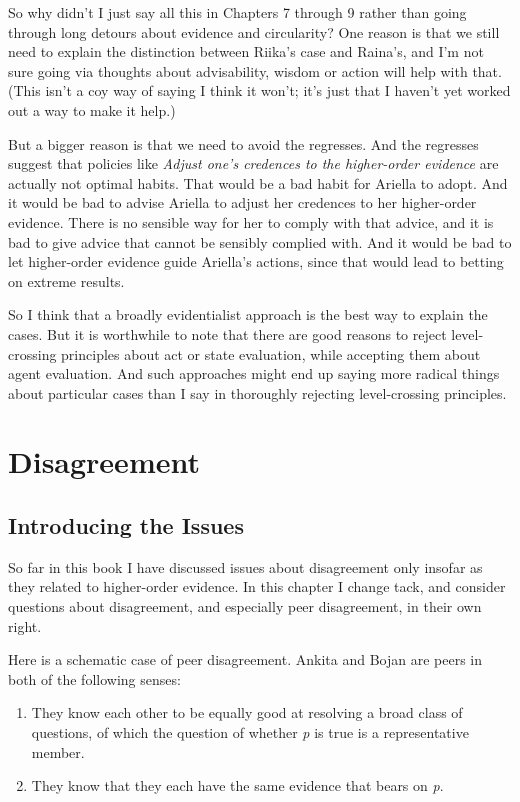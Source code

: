 \documentclass[
  10pt,
  letterpaper,
  twoside]{scrbook}
\providecommand{\tightlist}{%
  \setlength{\itemsep}{0pt}\setlength{\parskip}{0pt}}\usepackage{longtable,booktabs,array}
\begin{document}
So why didn't I just say all this in Chapters 7 through 9 rather than
going through long detours about evidence and circularity? One reason is
that we still need to explain the distinction between {Riika}'s case and
Raina's, and I'm not sure going via thoughts about advisability, wisdom
or action will help with that. (This isn't a coy way of saying I think
it won't; it's just that I haven't yet worked out a way to make it
help.)

But a bigger reason is that we need to avoid the regresses. And the
regresses suggest that policies like \emph{Adjust one's credences to the
higher-order evidence} are actually not optimal habits. That would be a
bad habit for {Ariella} to adopt. And it would be bad to advise
{Ariella} to adjust her credences to her higher-order evidence. There is
no sensible way for her to comply with that advice, and it is bad to
give advice that cannot be sensibly complied with. And it would be bad
to let higher-order evidence guide {Ariella}'s actions, since that would
lead to betting on extreme results.

So I think that a broadly evidentialist approach is the best way to
explain the cases. But it is worthwhile to note that there are good
reasons to reject level-crossing principles about act or state
evaluation, while accepting them about agent evaluation. And such
approaches might end up saying more radical things about particular
cases than I say in thoroughly rejecting level-crossing principles.

\chapter{Disagreement}\label{disagreement-1}

\section{Introducing the Issues}\label{introducingtheissues}

So far in this book I have discussed issues about disagreement only
insofar as they related to higher-order evidence. In this chapter I
change tack, and consider questions about disagreement, and especially
peer disagreement, in their own right.

Here is a schematic case of peer disagreement. {Ankita} and {Bojan} are
peers in both of the following senses:

\begin{enumerate}
\def\labelenumi{\arabic{enumi}.}
\tightlist
\item
  They know each other to be equally good at resolving a broad class of
  questions, of which the question of whether \emph{p} is true is a
  representative member.
\item
  They know that they each have the same evidence that bears on
  \emph{p}.
\end{enumerate}
\end{document}
